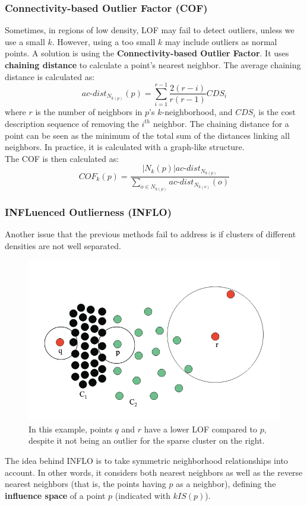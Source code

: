 \subsubsection{Connectivity-based Outlier Factor (COF)}

Sometimes, in regions of low density, LOF may fail to detect outliers, unless we use a small $k$. However, using a too small $k$ may include outliers as normal points. A solution is using the \textbf{Connectivity-based Outlier Factor}. It uses \textbf{chaining distance} to calculate a point's nearest neighbor. The average chaining distance is calculated as:
\begin{equation*}
    \textit{ac-dist}_{N_{k(p)}}(p) = \sum_{i=1}^{r-1} \dfrac{2(r-i)}{r(r-1)} CDS_i
\end{equation*}
where $r$ is the number of neighbors in $p$'s $k$-neighborhood, and $CDS_i$ is the cost description sequence of removing the $i^{th}$ neighbor. The chaining distance for a point can be seen as the minimum of the total sum of the distances linking all neighbors. In practice, it is calculated with a graph-like structure. \\
The COF is then calculated as:
\begin{equation*}
    \textit{COF}_k(p) = \dfrac{|N_k(p)| \textit{ac-dist}_{N_{k(p)}}}{\sum_{o \in N_{k(p)}} \textit{ac-dist}_{N_{k(o)}}(o)}
\end{equation*}

\subsubsection{INFLuenced Outlierness (INFLO)}

Another issue that the previous methods fail to address is if clusters of different densities are not well separated.
\begin{figure}[ht]
    \centering
    \includegraphics[width=0.5\linewidth]{img/inflo.png}
    \caption{In this example, points $q$ and $r$ have a lower LOF compared to $p$, despite it not being an outlier for the sparse cluster on the right.}
    \label{fig:inflo}
\end{figure}
The idea behind INFLO is to take symmetric neighborhood relationships into account. In other words, it considers both nearest neighbors as well as the reverse nearest neighbors (that is, the points having $p$ as a neighbor), defining the \textbf{influence space} of a point $p$ (indicated with $kIS(p)$).

